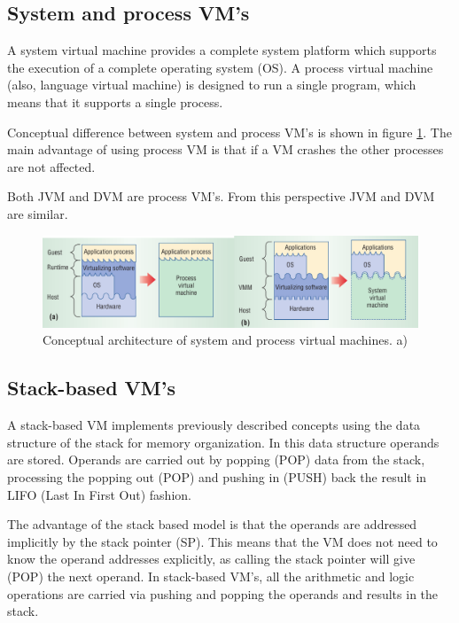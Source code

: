 \documentclass[11pt, oneside]{article}   	%
\begin{document}

\subsection{System and process VM's}

A system virtual machine provides a complete system platform which supports the execution of a complete operating system (OS). A process virtual machine (also, language virtual machine) is designed to run a single program, which means that it supports a single process\cite{wiki_vm}.

Conceptual difference between system and process VM's is shown in figure \ref{fig:system_and_process}. The main advantage of using process VM is that if a VM crashes the other processes are not affected.

Both JVM and DVM are process VM's. From this perspective JVM and DVM are similar.
\begin{figure}
  \center
  \includegraphics[width=\textwidth]{./images/vms.png}
  \caption{Conceptual architecture of system and process virtual machines\cite{smith2005architecture}. a)}
  \label{fig:system_and_process}
\end{figure}

\subsection{Stack-based VM's}

A stack-based VM implements  previously described concepts using the data structure of the stack for memory organization. In this data structure operands are stored. Operands are carried out by popping (POP) data from the stack, processing the popping out (POP) and pushing in (PUSH) back the result in LIFO (Last In First Out) fashion. 

The advantage of the stack based model is that the operands are addressed implicitly by the stack pointer (SP). This means that the VM does not need to know the operand addresses explicitly, as calling the stack pointer will give (POP) the next operand. In stack-based VM's, all the arithmetic and logic operations are carried via pushing and popping the operands and results in the stack.
\end{document}
